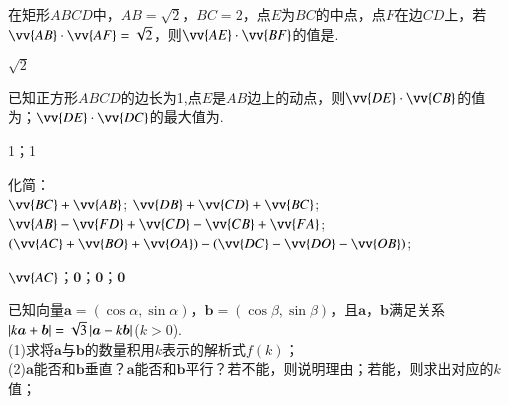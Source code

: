 \begin{Theorem}[平面向量基本定理]
\begin{exercise}
\begin{answer}
      \end{answer}
    \item%
      在矩形$ABCD$中，$AB=\sqrt{2}$，$BC=2$，点$E$为$BC$的中点，点$F$在边$CD$上，若$\vv{AB}\cdot\vv{AF}=\sqrt{2}$，则$\vv{AE}\cdot\vv{BF}$的值是\tk.
      \begin{answer}
        $\sqrt{2}$
      \end{answer}
    \item%
      已知正方形$ABCD$的边长为1,点$E$是$AB$边上的动点，则$\vv{DE}\cdot\vv{CB}$的值为\tk；$\vv{DE}\cdot\vv{DC}$的最大值为\tk.
      \begin{answer}
        1；1
      \end{answer}
    \item%
      化简：\\
       $\vv{BC}+\vv{AB}$; \hspace{2em}  $\vv{DB}+\vv{CD}+\vv{BC}$;\\
       $\vv{AB}-\vv{FD}+\vv{CD}-\vv{CB}+\vv{FA}$;\hspace{2em}  $(\vv{AC}+\vv{BO}+\vv{OA})-(\vv{DC}-\vv{DO}-\vv{OB})$;\\
      \begin{answer}
        $\vv{AC}$；$\bm 0$；$\bm 0$；$\bm 0$
      \end{answer}
    \vspace{1.5cm}
    \item%
      已知向量$\bm a=(\cos\alpha,\sin\alpha)$，$\bm b=(\cos\beta,\sin\beta)$，且$\bm a$，$\bm b$满足关系$\left| k\bm a+\bm b \right|=\sqrt{3}\left| \bm a-k\bm b \right|$($k>0$).\\
      (1)求将$\bm a$与$\bm b$的数量积用$k$表示的解析式$f(k)$；\\
      (2)\hspace{5pt}$\bm a$能否和$\bm b$垂直？$\bm a$能否和$\bm b$平行？若不能，则说明理由；若能，则求出对应的$k$值；\\

\end{exercise}
\end{Theorem}
